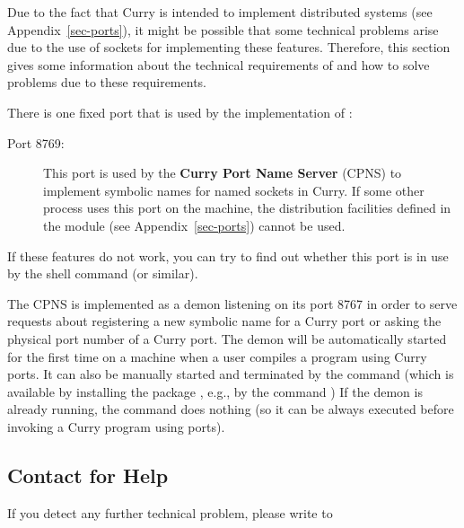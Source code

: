 Due to the fact that Curry is intended to implement
distributed systems (see Appendix~\ref{sec-ports}),
it might be possible that some technical problems
arise due to the use of sockets for implementing these
features. Therefore, this section gives some information
about the technical requirements of \CYS and how to solve
problems due to these requirements.

There is one fixed port that is used by the implementation of \CYS:
\begin{description}
\item[Port 8769:] This port is used by the
{\bf Curry Port Name Server} (CPNS) to implement symbolic names for
named sockets in Curry.
If some other process uses this port on the machine,
the distribution facilities defined in the module 
(see Appendix~\ref{sec-ports}) cannot be used.
\end{description}
If these features do not work, you can try to find out
whether this port is in use by the shell command
 (or similar).

The CPNS is implemented as a demon listening on its port 8767
in order to serve requests about registering a new symbolic
name for a Curry port or asking the physical port number
of a Curry port. The demon will be automatically started for
the first time on a machine when a user compiles a program
using Curry ports.
It can also be manually started and terminated by the
command  (which is available by installing
the package , e.g., by the command )
If the demon is already running,
the command 
does nothing (so it can be always executed
before invoking a Curry program using ports).

\subsection{Contact for Help}

If you detect any further technical problem,
please write to
\begin{center}
\end{center}

